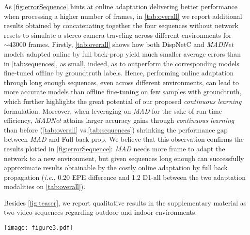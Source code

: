 \documentclass[10pt,twocolumn,letterpaper]{article}
\def\ie{\emph{i.e.}}
\def\netname{\emph{MADNet}}
\def\algoname{\emph{MAD}}
\def\kitti{KITTI}
\begin{document}
As \autoref{fig:errorSequence} hints at online adaptation delivering better performance when processing a higher number of frames,  in \autoref{tab:overall} we report additional results obtained by concatenating together the four sequences without network resets to simulate a stereo camera traveling across different environments for $\sim43000$ frames. Firstly,  \autoref{tab:overall} shows how both DispNetC and \netname{} models adapted online by full back-prop yield much smaller average errors than in \autoref{tab:sequences}, as small, indeed, as to outperform the corresponding models fine-tuned offline by groundtruth labels. Hence, performing online adaptation through long enough sequences, even across different environments, can lead to more accurate models than offline fine-tuning on few samples with groundtruth, which further highlights the great potential of our proposed \emph{ continuous learning} formulation. Moreover, when leveraging on \algoname{} for the sake of run-time efficiency, \netname{} attains larger accuracy gains through \emph{continuous learning} than before (\autoref{tab:overall} vs.\autoref{tab:sequences}) shrinking the performance gap between \algoname{} and Full back-prop. We believe that this observation confirms the results plotted in \autoref{fig:errorSequence}: \algoname{} needs more frame to adapt the network to a new environment, but given sequences long enough can successfully approximate results obtainable by the costly online adaptation by full back propagation (\ie, 0.20 EPE difference and 1.2 D1-all between the two adaptation modalities on \autoref{tab:overall}).

Besides \autoref{fig:teaser}, we report qualitative results in the supplementary material as two video sequences regarding outdoor \cite{KITTI_RAW} and indoor \cite{indoorDataset} environments. 


\begin{figure*}
	\centering
	\texttt{[image: figure3.pdf]}
	\caption{\netname{}: error across frames in the \emph{2011\_09\_30\_drive\_0028\_sync} sequence (\kitti{} dataset, \emph{Residential} environment).
		\label{fig:errorSequence}
	}
\end{figure*}
\end{document}
